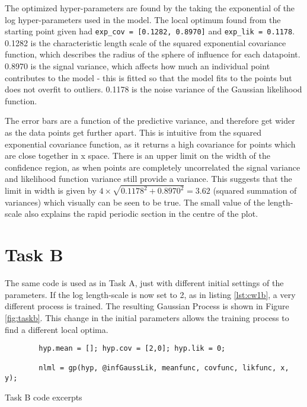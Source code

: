 \documentclass[11pt]{amsart}
\begin{document}
The optimized hyper-parameters are found by the taking the exponential of the log hyper-parameters used in the model. The local optimum found from the starting point given had \verb|exp_cov = [0.1282, 0.8970]| and \verb|exp_lik = 0.1178|. 0.1282 is the characteristic length scale of the squared exponential covariance function, which describes the radius of the sphere of influence for each datapoint. 0.8970 is the signal variance, which affects how much an individual point contributes to the model - this is fitted so that the model fits to the points but does not overfit to outliers. 0.1178 is the noise variance of the Gaussian likelihood function.

The error bars are a function of the predictive variance, and therefore get wider as the data points get further apart. This is intuitive from the squared exponential covariance function, as it returns a high covariance for points which are close together in x space. There is an upper limit on the width of the confidence region, as when points are completely uncorrelated the signal variance and likelihood function variance still provide a variance. This suggests that the limit in width is given by $4\times\sqrt{0.1178^{2} + 0.8970^{2}} = 3.62$ (squared summation of variances) which visually can be seen to be true. The small value of the length-scale also explains the rapid periodic section in the centre of the plot.

\section{Task B}
The same code is used as in Task A, just with different initial settings of the parameters. If the log length-scale is now set to 2, as in listing \ref{lst:cw1b}, a very different process is trained. The resulting Gaussian Process is shown in Figure \ref{fig:taskb}. This change in the initial parameters allows the training process to find a different local optima. 

\begin{listing}[H]
    \begin{verbatim}
        hyp.mean = []; hyp.cov = [2,0]; hyp.lik = 0;

        nlml = gp(hyp, @infGaussLik, meanfunc, covfunc, likfunc, x, y);
    \end{verbatim}
    \caption{Task B code excerpts} \label{lst:cw1b}
\end{listing}
\end{document}
